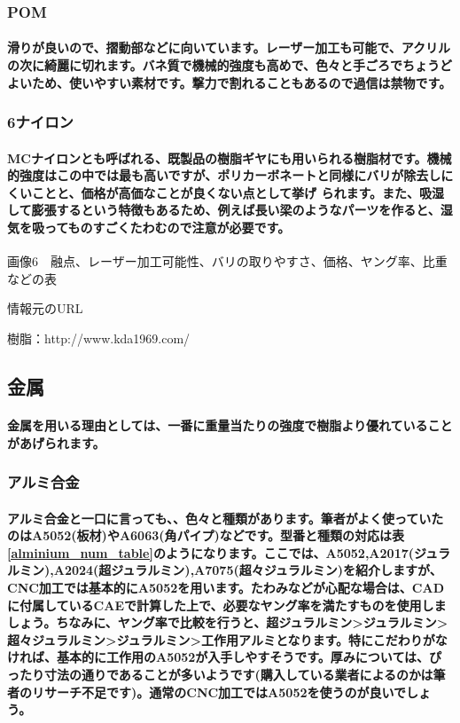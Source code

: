 \documentclass[b5paper, 9pt, twocolumn, titlepage,openany]{jsbook}%
\begin{document}
\subsubsection{POM}

\paragraph{滑りが良いので、摺動部などに向いています。レーザー加工も可能で、アクリルの次に綺麗に切れます。バネ質で機械的強度も高めで、色々と手ごろでちょうどよいため、使いやすい素材です。撃力で割れることもあるので過信は禁物です。}

\subsubsection{6ナイロン}

\paragraph{MCナイロンとも呼ばれる、既製品の樹脂ギヤにも用いられる樹脂材です。機械的強度はこの中では最も高いですが、ポリカーボネートと同様にバリが除去しにくいことと、価格が高価なことが良くない点として挙げ られます。また、吸湿して膨張するという特徴もあるため、例えば長い梁のようなパーツを作ると、湿気を吸ってものすごくたわむので注意が必要です。}

画像6　融点、レーザー加工可能性、バリの取りやすさ、価格、ヤング率、比重などの表

情報元のURL

樹脂：http://www.kda1969.com/

\subsection{金属}

\paragraph{金属を用いる理由としては、一番に重量当たりの強度で樹脂より優れていることがあげられます。}

\subsubsection{アルミ合金}

\paragraph{アルミ合金と一口に言っても、、色々と種類があります。筆者がよく使っていたのはA5052(板材)やA6063(角パイプ)などです。型番と種類の対応は表\ref{alminium_num_table}のようになります。ここでは、A5052,A2017(ジュラルミン),A2024(超ジュラルミン),A7075(超々ジュラルミン)を紹介しますが、CNC加工では基本的にA5052を用います。たわみなどが心配な場合は、CADに付属しているCAEで計算した上で、必要なヤング率を満たすものを使用しましょう。ちなみに、ヤング率で比較を行うと、超ジュラルミン>ジュラルミン>超々ジュラルミン>ジュラルミン>工作用アルミとなります。特にこだわりがなければ、基本的に工作用のA5052が入手しやすそうです。厚みについては、ぴったり寸法の通りであることが多いようです(購入している業者によるのかは筆者のリサーチ不足です)。通常のCNC加工ではA5052を使うのが良いでしょう。}
\end{document}
